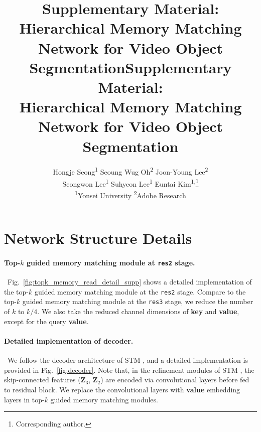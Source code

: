 \title{Supplementary Material:\\
Hierarchical Memory Matching Network for Video Object Segmentation}



\title{Supplementary Material:\\
Hierarchical Memory Matching Network for Video Object Segmentation}

\author{Hongje Seong\textsuperscript{1} \quad\quad Seoung Wug Oh\textsuperscript{2} \quad\quad Joon-Young Lee\textsuperscript{2} \\ Seongwon Lee\textsuperscript{1} \quad\quad Suhyeon Lee\textsuperscript{1} \quad\quad Euntai Kim\textsuperscript{1,}\thanks{Corresponding author.}\vspace*{0.2cm}\\
{\textsuperscript{1}Yonsei University \quad\quad\quad \textsuperscript{2}Adobe Research}}

\maketitle
\ificcvfinal\thispagestyle{empty}\fi

\vspace{-5mm}
\section{Network Structure Details}
\label{sec:1.Network_Structure_Details}
\paragraph{Top-$k$ guided memory matching module at \texttt{res2} stage.}~Fig.~\ref{fig:topk_memory_read_detail_supp} shows a detailed implementation of the top-$k$ guided memory matching module at the \texttt{res2} stage.
Compare to the top-$k$ guided memory matching module at the \texttt{res3} stage, we reduce the number of $k$ to $k/4$.
We also take the reduced channel dimensions of \textbf{key} and \textbf{value}, except for the query \textbf{value}.

\paragraph{Detailed implementation of decoder.}~We follow the decoder architecture of STM \cite{Oh_2019_ICCV}, and a detailed implementation is provided in Fig.~\ref{fig:decoder}.
Note that, in the refinement modules of STM \cite{Oh_2019_ICCV}, the skip-connected features ($\textbf{Z}_3$, $\textbf{Z}_2$) are encoded via convolutional layers before fed to residual block.
We replace the convolutional layers with \textbf{value} embedding layers in top-$k$ guided memory matching modules.


